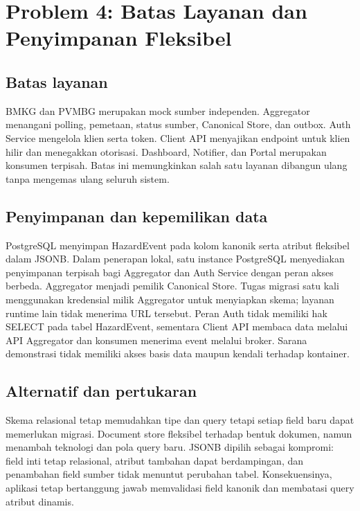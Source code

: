 \documentclass{fairmeta}
\begin{document}
\section{Problem 4: Batas Layanan dan Penyimpanan Fleksibel}

\subsection{Batas layanan}

BMKG dan PVMBG merupakan mock sumber independen. Aggregator menangani polling, pemetaan, status sumber, Canonical Store, dan outbox. Auth Service mengelola klien serta token. Client API menyajikan endpoint untuk klien hilir dan menegakkan otorisasi. Dashboard, Notifier, dan Portal merupakan konsumen terpisah. Batas ini memungkinkan salah satu layanan dibangun ulang tanpa mengemas ulang seluruh sistem.

\subsection{Penyimpanan dan kepemilikan data}

PostgreSQL menyimpan HazardEvent pada kolom kanonik serta atribut fleksibel dalam JSONB. Dalam penerapan lokal, satu instance PostgreSQL menyediakan penyimpanan terpisah bagi Aggregator dan Auth Service dengan peran akses berbeda. Aggregator menjadi pemilik Canonical Store. Tugas migrasi satu kali menggunakan kredensial milik Aggregator untuk menyiapkan skema; layanan runtime lain tidak menerima URL tersebut. Peran Auth tidak memiliki hak SELECT pada tabel HazardEvent, sementara Client API membaca data melalui API Aggregator dan konsumen menerima event melalui broker. Sarana demonstrasi tidak memiliki akses basis data maupun kendali terhadap kontainer.

\subsection{Alternatif dan pertukaran}

Skema relasional tetap memudahkan tipe dan query tetapi setiap field baru dapat memerlukan migrasi. Document store fleksibel terhadap bentuk dokumen, namun menambah teknologi dan pola query baru. JSONB dipilih sebagai kompromi: field inti tetap relasional, atribut tambahan dapat berdampingan, dan penambahan field sumber tidak menuntut perubahan tabel. Konsekuensinya, aplikasi tetap bertanggung jawab memvalidasi field kanonik dan membatasi query atribut dinamis.
\end{document}
